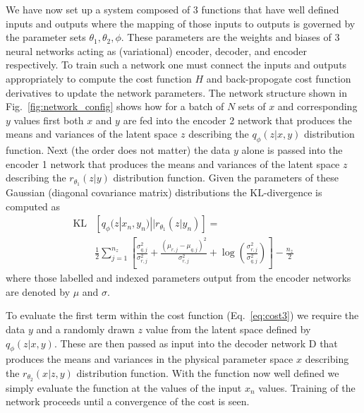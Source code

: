 \documentclass[%
showpacs,
 amsmath,amssymb,
 aps,
 twocolumn,
 prl,
 reprint,
floatfix,
]{revtex4-1}
\begin{document}
We have now set up a system composed of 3 functions that have well defined
inputs and outputs where the mapping of those inputs to outputs is governed by
the parameter sets $\theta_{1},\theta_{2},\phi$. These parameters are the
weights and biases of 3 neural networks acting as (variational) encoder,
decoder, and encoder respectively. To train such a network one must connect the
inputs and outputs appropriately to compute the cost function $H$ and
back-propogate cost function derivatives to update the network parameters. The
network structure shown in Fig.~\ref{fig:network_config} shows how for a batch
of $N$ sets of $x$ and corresponding $y$ values first both $x$ and $y$ are fed
into the encoder 2 network that produces the means and variances of the latent
space $z$ describing the $q_{\phi}(z|x,y)$ distribution function. Next (the
order does not matter) the data $y$ alone is passed into the encoder 1 network
that produces the means and variances of the latent space $z$ describing the
$r_{\theta_{1}}(z|y)$ distribution function. Given the parameters of these
Gaussian (diagonal covariance matrix) distributions the $\text{KL}$-divergence
is computed as
%
\begin{align}\label{eq:klgauss}
\text{KL}&\left[q_{\phi}(z|x_{n},y_{n})||r_{\theta_{1}}(z|y_{n})\right] =
\\
&\frac{1}{2}\sum_{j=1}^{n_{z}}\left[\frac{\sigma_{q,j}^{2}}{\sigma_{r,j}^{2}} +
\frac{(\mu_{r,j}-\mu_{q,j})^{2}}{\sigma_{r,j}^{2}}+
\log\left(\frac{\sigma_{r,j}^{2}}{\sigma_{q,j}^{2}}\right)\right] -
\frac{n_{z}}{2}\nonumber 
\end{align}
%
where those labelled and indexed parameters output from the encoder networks are
denoted by $\mu$ and $\sigma$.

To evaluate the first term within the cost function (Eq.~\ref{eq:cost3}) we
require the data $y$ and a randomly drawn $z$ value from the latent space defined
by $q_{\phi}(z|x,y)$. These are then passed as input into the decoder network D
that produces the means and variances in the physical parameter space $x$ describing
the $r_{\theta_{2}}(x|z,y)$ distribution function. With the function now well
defined we simply evaluate the function at the values of the input $x_{n}$
values. Training of the network proceeds until a convergence of the cost is
seen. 
\end{document}
